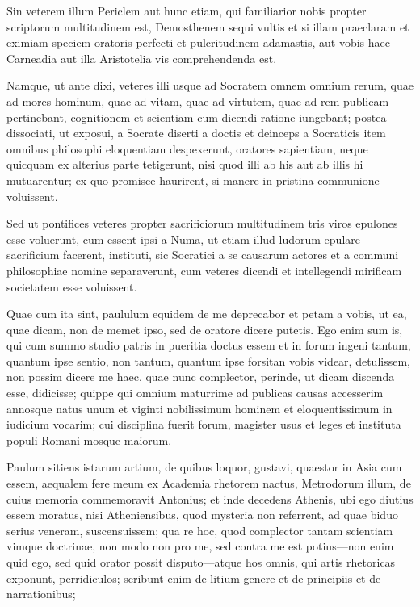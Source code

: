  Sin veterem illum Periclem aut hunc etiam, qui familiarior nobis propter scriptorum multitudinem est, Demosthenem sequi vultis et si illam praeclaram et eximiam speciem oratoris perfecti et pulcritudinem adamastis, aut vobis haec Carneadia aut illa Aristotelia vis comprehendenda est.

 Namque, ut ante dixi, veteres illi usque ad Socratem omnem omnium rerum, quae ad mores hominum, quae ad vitam, quae ad virtutem, quae ad rem publicam pertinebant, cognitionem et scientiam cum dicendi ratione iungebant; postea dissociati, ut exposui, a Socrate diserti a doctis et deinceps a Socraticis item omnibus philosophi eloquentiam despexerunt, oratores sapientiam, neque quicquam ex alterius parte tetigerunt, nisi quod illi ab his aut ab illis hi mutuarentur; ex quo promisce haurirent, si manere in pristina communione voluissent.

 Sed ut pontifices veteres propter sacrificiorum multitudinem tris viros epulones esse voluerunt, cum essent ipsi a Numa, ut etiam illud ludorum epulare sacrificium facerent, instituti, sic Socratici a se causarum actores et a communi philosophiae nomine separaverunt, cum veteres dicendi et intellegendi mirificam societatem esse voluissent.

 Quae cum ita sint, paululum equidem de me deprecabor et petam a vobis, ut ea, quae dicam, non de memet ipso, sed de oratore dicere putetis. Ego enim sum is, qui cum summo studio patris in pueritia doctus essem et in forum ingeni tantum, quantum ipse sentio, non tantum, quantum ipse forsitan vobis videar, detulissem, non possim dicere me haec, quae nunc complector, perinde, ut dicam discenda esse, didicisse; quippe qui omnium maturrime ad publicas causas accesserim annosque natus unum et viginti nobilissimum hominem et eloquentissimum in iudicium vocarim; cui disciplina fuerit forum, magister usus et leges et instituta populi Romani mosque maiorum.

 Paulum sitiens istarum artium, de quibus loquor, gustavi, quaestor in Asia cum essem, aequalem fere meum ex Academia rhetorem nactus, Metrodorum illum, de cuius memoria commemoravit Antonius; et inde decedens Athenis, ubi ego diutius essem moratus, nisi Atheniensibus, quod mysteria non referrent, ad quae biduo serius veneram, suscensuissem; qua re hoc, quod complector tantam scientiam vimque doctrinae, non modo non pro me, sed contra me est potius—non enim quid ego, sed quid orator possit disputo—atque hos omnis, qui artis rhetoricas exponunt, perridiculos; scribunt enim de litium genere et de principiis et de narrationibus;

